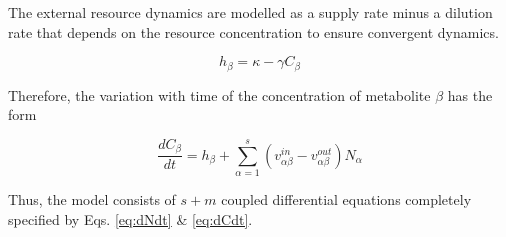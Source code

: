\documentclass[titlepage,11pt]{article}
\begin{document}
\begin{linenumbers}
			The external resource dynamics are modelled as a supply rate minus a dilution rate that depends on the resource concentration to ensure convergent dynamics. 
			\begin{linenomath*}	
			\begin{equation}
				h_{\beta}  =  \kappa - \gamma C_{\beta}
			\end{equation}
			\end{linenomath*}
			Therefore, the variation with time of the concentration of metabolite $ \beta $ has the form
			\begin{linenomath*}	
			\begin{equation}
					\dfrac{dC_{\beta}}{dt} = h_{\beta} + \sum_{{\alpha} = 1}^{s} \left(v_{{\alpha}\beta}^{in} -v_{{\alpha}\beta}^{out} \right)N_{\alpha} \label{eq:dCdt}
			\end{equation}
			\end{linenomath*}
			Thus, the model consists of $ s + m $ coupled differential equations completely specified by Eqs. \ref{eq:dNdt} \& \ref{eq:dCdt}.

\end{linenumbers}
\end{document}
